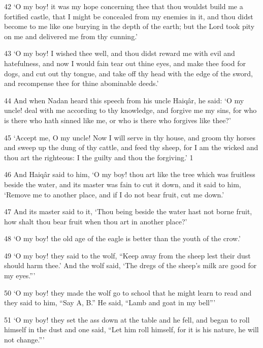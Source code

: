 \par 42 ‘O my boy! it was my hope concerning thee that thou wouldst build me a fortified castle, that I might be concealed from my enemies in it, and thou didst become to me like one burying in the depth of the earth; but the Lord took pity on me and delivered me from thy cunning.’

\par 43 ‘O my boy! I wished thee well, and thou didst reward me with evil and hatefulness, and now I would fain tear out thine eyes, and make thee food for dogs, and cut out thy tongue, and take off thy head with the edge of the sword, and recompense thee for thine abominable deeds.’

\par 44 And when Nadan heard this speech from his uncle Haiqâr, he said: ‘O my uncle! deal with me according to thy knowledge, and forgive me my sins, for who is there who hath sinned like me, or who is there who forgives like thee?’

\par 45 ‘Accept me, O my uncle! Now I will serve in thy house, and groom thy horses and sweep up the dung of thy cattle, and feed thy sheep, for I am the wicked and thou art the righteous: I the guilty and thou the forgiving.’ 1

\par 46 And Haiqâr said to him, ‘O my boy! thou art like the tree which was fruitless beside the water, and its master was fain to cut it down, and it said to him, ‘Remove me to another place, and if I do not bear fruit, cut me down.’

\par 47 And its master said to it, ‘Thou being beside the water hast not borne fruit, how shalt thou bear fruit when thou art in another place?’

\par 48 ‘O my boy! the old age of the eagle is better than the youth of the crow.’

\par 49 ‘O my boy! they said to the wolf, “Keep away from the sheep lest their dust should harm thee.’ And the wolf said, ‘The dregs of the sheep's milk are good for my eyes.”’

\par 50 ‘O my boy! they made the wolf go to school that he might learn to read and they said to him, “Say A, B.” He said, “Lamb and goat in my bell”’

\par 51 ‘O my boy! they set the ass down at the table and he fell, and began to roll himself in the dust and one said, “Let him roll himself, for it is his nature, he will not change.”’

